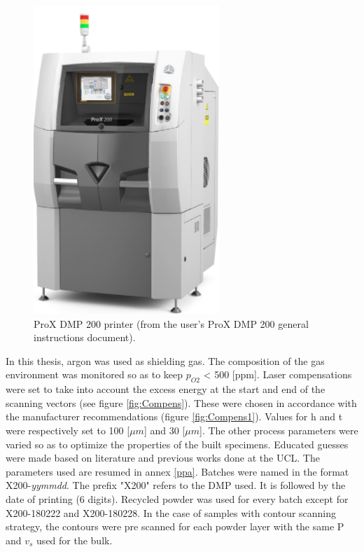 \begin{figure}[th]
\centering
\includegraphics[scale=0.7]{Images/Printer}
\decoRule
\caption[ProX DMP 200 printer]{ProX DMP 200 printer (from the user's ProX DMP 200 general instructions document).}
\label{fig:Printer}
\end{figure}

In this thesis, argon was used as shielding gas. The composition of the gas environment was monitored so as to keep $p_{O2}$ < 500 [ppm]. Laser compensations were set to take into account the excess energy at the start and end of the scanning vectors (see figure \ref{fig:Compens}). These were chosen in accordance with the manufacturer recommendations (figure \ref{fig:Compens1}). Values for h and t were respectively set to 100 [$\mu m$] and 30 [$\mu m$]. The other process parameters were varied so as to optimize the properties of the built specimens. Educated guesses were made based on literature and previous works done at the UCL. The parameters used are resumed in annex \ref{ppa}. Batches were named in the format X200-\textit{yymmdd}. The prefix "X200" refers to the DMP used. It is followed by the date of printing (6 digits). Recycled powder was used for every batch except for X200-180222 and X200-180228. In the case of samples with contour scanning strategy, the contours were pre scanned for each powder layer with the same P and $v_s$ used for the bulk. \\

